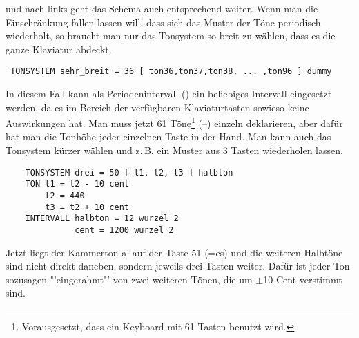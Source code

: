 und nach links geht das Schema auch entsprechend weiter.
Wenn man die Einschränkung fallen lassen will, dass sich das Muster
der Töne periodisch wiederholt, so braucht man nur das Tonsystem
so breit zu wählen, dass es die ganze Klaviatur abdeckt.
\begin{verbatim}
 TONSYSTEM sehr_breit = 36 [ ton36,ton37,ton38, ... ,ton96 ] dummy
\end{verbatim}
In diesem Fall kann als Periodenintervall () ein
beliebiges Intervall eingesetzt werden, da es im Bereich der
verfügbaren Klaviaturtasten sowieso keine Auswirkungen hat.
Man muss jetzt 61 Töne\footnote{Vorausgesetzt, dass ein Keyboard
 mit 61 Tasten benutzt wird.} (--) einzeln
deklarieren, aber dafür hat man die Tonhöhe jeder einzelnen Taste
in der Hand. Man kann auch das Tonsystem kürzer wählen und z.\,B.
ein Muster aus 3 Tasten wiederholen lassen.
\begin{verbatim}
    TONSYSTEM drei = 50 [ t1, t2, t3 ] halbton
    TON t1 = t2 - 10 cent
        t2 = 440
        t3 = t2 + 10 cent
    INTERVALL halbton = 12 wurzel 2
              cent = 1200 wurzel 2
\end{verbatim}
Jetzt liegt der Kammerton a' auf der Taste 51 (=es) und die weiteren 
Halbtöne sind nicht direkt daneben, sondern jeweils drei Tasten
weiter. Dafür ist jeder Ton sozusagen "'eingerahmt"' von 
zwei weiteren Tönen, die um $\pm$10 Cent verstimmt sind.

